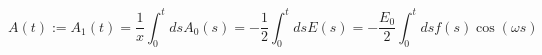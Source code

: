 \begin{equation}
A(t):=A_{1}(t)=\frac{1}{x}\int_{0}^{t}dsA_{0}(s)=-\frac{1}{2}%
\int_{0}^{t}dsE(s)=-\frac{E_{0}}{2}\int_{0}^{t}dsf(s)\cos (\omega s)
\label{EF1}
\end{equation}

